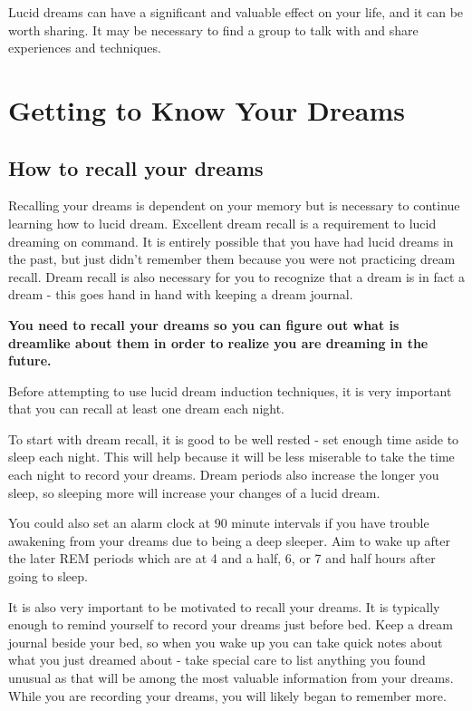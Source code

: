 \documentclass{book}
\begin{document}
Lucid dreams can have a significant and valuable effect on your life, and it can be worth sharing. It may be necessary to find a group to talk with and share experiences and techniques.

\section{Getting to Know Your Dreams}
\subsection{How to recall your dreams}
Recalling your dreams is dependent on your memory but is necessary to continue learning how to lucid dream. Excellent dream recall is a requirement to lucid dreaming on command. It is entirely possible that you have had lucid dreams in the past, but just didn't remember them because you were not practicing dream recall. Dream recall is also necessary for you to recognize that a dream is in fact a dream - this goes hand in hand with keeping a dream journal.

\textbf{You need to recall your dreams so you can figure out what is dreamlike about them in order to realize you are dreaming in the future.}

Before attempting to use lucid dream induction techniques, it is very important that you can recall at least one dream each night.

To start with dream recall, it is good to be well rested - set enough time aside to sleep each night. This will help because it will be less miserable to take the time each night to record your dreams. Dream periods also increase the longer you sleep, so sleeping more will increase your changes of a lucid dream.

You could also set an alarm clock at 90 minute intervals if you have trouble awakening from your dreams due to being a deep sleeper. Aim to wake up after the later REM periods which are at 4 and a half, 6, or 7 and half hours after going to sleep.

It is also very important to be motivated to recall your dreams. It is typically enough to remind yourself to record your dreams just before bed. Keep a dream journal beside your bed, so when you wake up you can take quick notes about what you just dreamed about - take special care to list anything you found unusual as that will be among the most valuable information from your dreams. While you are recording your dreams, you will likely began to remember more.
\end{document}
